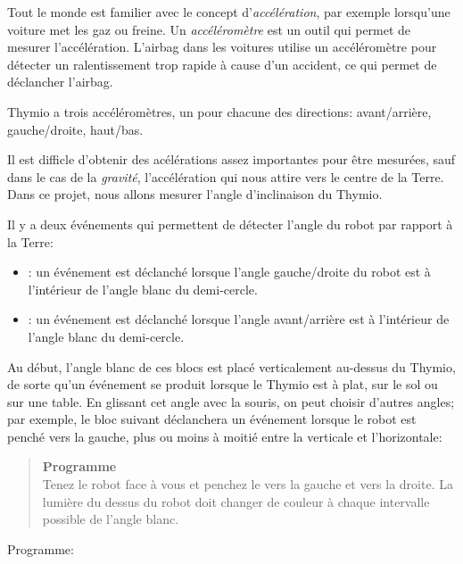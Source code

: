 \label{ch.angles}

Tout le monde est familier avec le concept d'\emph{accélération}, par exemple lorsqu'une voiture met les gaz ou freine.
Un \emph{accéléromètre} est un outil qui permet de mesurer
l'accélération.
L'airbag dans les voitures utilise un accéléromètre pour
détecter un ralentissement trop rapide à cause d'un accident,
ce qui permet de déclancher l'airbag.

Thymio a trois accéléromètres, un pour chacune des directions:
avant/arrière, gauche/droite, haut/bas.

Il est difficle d'obtenir des acélérations assez importantes
pour être mesurées, sauf dans le cas de la \emph{gravité}, l'accélération qui nous attire vers le centre de la Terre.
Dans ce projet, nous allons mesurer l'angle d'inclinaison
du Thymio.

Il y a deux événements qui permettent de détecter l'angle
du robot par rapport à la Terre: \label{p.accel}

\begin{itemize}

\item {}: un événement est déclanché lorsque l'angle gauche/droite du robot est à l'intérieur de l'angle blanc
du demi-cercle.

\item {}: un événement est déclanché 
lorsque l'angle avant/arrière est à l'intérieur
de l'angle blanc du demi-cercle.

\end{itemize}

Au début, l'angle blanc de ces blocs est placé verticalement
au-dessus du Thymio, de sorte qu'un événement se produit
lorsque le Thymio est à plat, sur le sol ou sur une table.
En glissant cet angle avec la souris, on peut choisir 
d'autres angles; par exemple, le bloc suivant
déclanchera un événement lorsque le robot est penché vers la
gauche, plus ou moins à moitié entre la verticale et
l'horizontale:

\begin{quote}
\textbf{Programme}\\
Tenez le robot face à vous et penchez le vers la gauche
et vers la droite.
La lumière du dessus du robot doit changer de couleur
à chaque intervalle possible de l'angle blanc.
\end{quote}

{\raggedleft \hfill Programme: }


